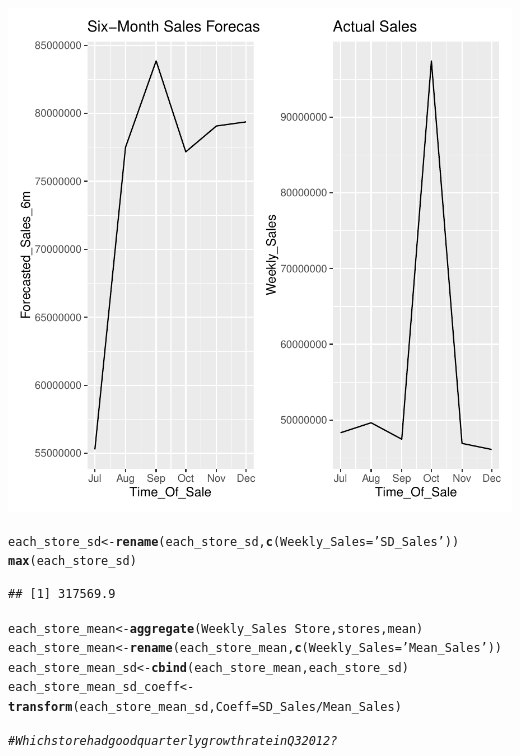 \documentclass{article}\usepackage[]{graphicx}\usepackage[]{color}
\makeatletter
\newcommand{\hlstr}[1]{\textcolor[rgb]{0.192,0.494,0.8}{#1}}%
\newcommand{\hlcom}[1]{\textcolor[rgb]{0.678,0.584,0.686}{\textit{#1}}}%
\newcommand{\hlopt}[1]{\textcolor[rgb]{0,0,0}{#1}}%
\newcommand{\hlstd}[1]{\textcolor[rgb]{0.345,0.345,0.345}{#1}}%
\newcommand{\hlkwb}[1]{\textcolor[rgb]{0.69,0.353,0.396}{#1}}%
\newcommand{\hlkwc}[1]{\textcolor[rgb]{0.333,0.667,0.333}{#1}}%
\newcommand{\hlkwd}[1]{\textcolor[rgb]{0.737,0.353,0.396}{\textbf{#1}}}%
\newenvironment{kframe}{%
 \def\at@end@of@kframe{}%
 \ifinner\ifhmode%
  \def\at@end@of@kframe{\end{minipage}}%
  \begin{minipage}{\columnwidth}%
 \fi\fi%
 \def\FrameCommand##1{\hskip\@totalleftmargin \hskip-\fboxsep
 \colorbox{shadecolor}{##1}\hskip-\fboxsep
     \hskip-\linewidth \hskip-\@totalleftmargin \hskip\columnwidth}%
 \MakeFramed {\advance\hsize-\width
   \@totalleftmargin\z@ \linewidth\hsize
   \@setminipage}}%
 {\par\unskip\endMakeFramed%
 \at@end@of@kframe}
\newenvironment{knitrout}{}{} %
\makeatother
\begin{document}
\begin{knitrout}
{\centering \includegraphics[width=.6\linewidth]{figure/Walmart-Sales-Rnwauto-report-1} 

}


\begin{kframe}\begin{alltt}
\hlstd{each_store_sd} \hlkwb{<-} \hlkwd{rename}\hlstd{(each_store_sd,} \hlkwd{c}\hlstd{(}\hlkwc{Weekly_Sales} \hlstd{=} \hlstr{'SD_Sales'}\hlstd{))}
\hlkwd{max}\hlstd{(each_store_sd)}
\end{alltt}
\begin{verbatim}
## [1] 317569.9
\end{verbatim}
\begin{alltt}
\hlstd{each_store_mean} \hlkwb{<-} \hlkwd{aggregate}\hlstd{(Weekly_Sales}\hlopt{~}\hlstd{Store, stores, mean)}
\hlstd{each_store_mean} \hlkwb{<-} \hlkwd{rename}\hlstd{(each_store_mean,} \hlkwd{c}\hlstd{(}\hlkwc{Weekly_Sales} \hlstd{=} \hlstr{'Mean_Sales'}\hlstd{))}
\hlstd{each_store_mean_sd} \hlkwb{<-} \hlkwd{cbind}\hlstd{(each_store_mean, each_store_sd)}
\hlstd{each_store_mean_sd_coeff} \hlkwb{<-} \hlkwd{transform}\hlstd{(each_store_mean_sd,} \hlkwc{Coeff} \hlstd{= SD_Sales}\hlopt{/}\hlstd{Mean_Sales)}

\hlcom{#Which store had good quarterly growth rate in Q32012?}


\end{alltt}
\end{kframe}
\end{knitrout}
\end{document}
